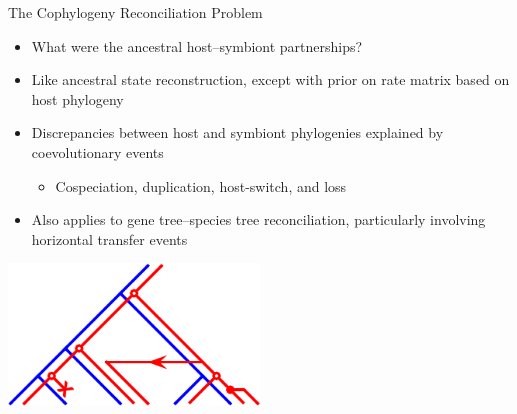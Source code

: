 \documentclass{beamer}
\begin{document}
\begin{frame}{The Cophylogeny Reconciliation Problem}

\begin{itemize}

\item What were the ancestral host--symbiont partnerships? \pause

\item Like ancestral state reconstruction, except with prior on rate matrix based on host phylogeny \pause

\item Discrepancies between host and symbiont phylogenies explained by coevolutionary events
\begin{itemize}
\item Cospeciation, duplication, host-switch, and loss
\end{itemize}

\pause

\item Also applies to gene tree--species tree reconciliation, particularly involving horizontal transfer events

\end{itemize}

\centering
{}\includegraphics[width=0.5\textwidth]{beamer-pics.pdf}


\end{frame}
\end{document}
